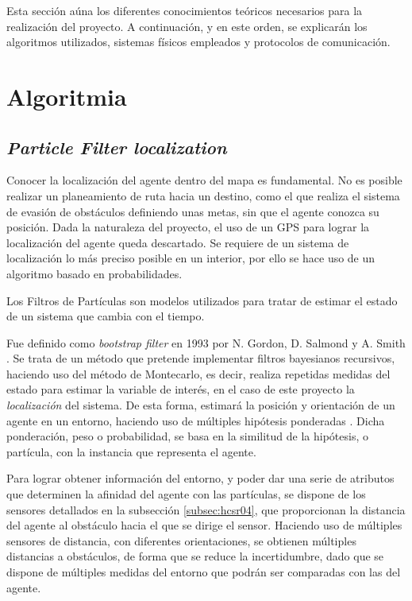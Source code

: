 

Esta sección aúna los diferentes conocimientos teóricos necesarios para la realización del proyecto. A continuación, y en este orden, se explicarán los algoritmos utilizados, sistemas físicos empleados y  protocolos de comunicación.

\section{Algoritmia}


\subsection{\emph{Particle Filter localization}}
\label{subsec:PF}

Conocer la localización del agente dentro del mapa es fundamental. No es posible realizar un planeamiento de ruta hacia un destino, como el que realiza el sistema de evasión de obstáculos definiendo unas metas, sin que el agente conozca su posición.
Dada la naturaleza del proyecto, el uso de un GPS para lograr la localización del agente queda descartado. Se requiere de un sistema de localización lo más preciso posible en un interior, por ello se hace uso de un algoritmo basado en probabilidades. 

Los Filtros de Partículas son modelos utilizados para tratar de estimar el estado de un sistema que cambia con el tiempo. 


Fue definido como \textit{bootstrap filter} en 1993 por N. Gordon, D. Salmond y A. Smith \citep{art:GSSPF}.  Se trata de un método que pretende implementar filtros bayesianos recursivos, haciendo uso del método de Montecarlo, es decir, realiza repetidas medidas del estado para estimar la variable de interés, en el caso de este proyecto la \emph{localización} del sistema. De esta forma, estimará la posición y orientación de un agente en un entorno, haciendo uso de múltiples hipótesis ponderadas \citep{art:PFTuto}.
Dicha ponderación, peso o probabilidad, se basa en la similitud de la hipótesis, o partícula, con la instancia que representa el agente. 

Para lograr obtener información del entorno, y poder dar una serie de atributos que determinen la afinidad del agente con las partículas, se dispone de los sensores detallados en la subsección \ref{subsec:hcsr04}, que proporcionan la distancia del agente al obstáculo hacia el que se dirige el sensor. 
Haciendo uso de múltiples sensores de distancia, con diferentes orientaciones, se obtienen múltiples distancias a obstáculos, de forma que se reduce la incertidumbre, dado que se dispone de múltiples medidas del entorno que podrán ser comparadas con las del agente. 


